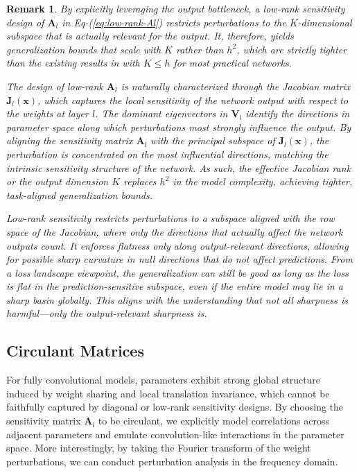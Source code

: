 \documentclass[journal]{IEEEtran} %
\def\eqref#1{Eq-(\ref{#1})}
\newtheorem{remark}{Remark}%
\def\vx{{\bm{x}}}
\def\mA{{\bm{A}}}
\def\mJ{{\bm{J}}}
\def\mV{{\bm{V}}}
\begin{document}
\begin{remark} \upshape
By explicitly leveraging the output bottleneck, a low-rank sensitivity design of $\mA_l$ in \eqref{eq:low-rank-Al} restricts perturbations to the $K$-dimensional subspace that is actually relevant for the output. It, therefore, yields generalization bounds that scale with $K$ rather than $h^2$, which are strictly tighter than the existing results in \cite{neyshabur2018pac} with $K \le h$ for most practical networks. 

The design of low-rank $\mA_l$ is naturally characterized through the Jacobian matrix $\mJ_l(\vx)$, which captures the local sensitivity of the network output with respect to the weights at layer $l$. The dominant eigenvectors in $\mV_l$ identify the directions in parameter space along which perturbations most strongly influence the output. By aligning the sensitivity matrix 
$\mA_l$ with the principal subspace of $\mJ_l(\vx)$, the perturbation is concentrated on the most influential directions, matching the intrinsic sensitivity structure of the network. As such, the effective Jacobian rank or the output dimension $K$ replaces $h^2$ in the model complexity, achieving tighter, task-aligned generalization bounds.

Low-rank sensitivity restricts perturbations to a subspace aligned with the row space of the Jacobian, where only the directions that actually affect the network outputs count. It enforces flatness only along output-relevant directions, allowing for possible sharp curvature in null directions that do not affect predictions.
From a loss landscape viewpoint, the generalization can still be good as long as the loss is flat in the prediction-sensitive subspace, even if the entire model may lie in a sharp basin globally. This aligns with the understanding that not all sharpness is harmful---only the output-relevant sharpness is.  
\end{remark}





\subsection{Circulant Matrices}
For fully convolutional models, parameters exhibit strong global structure induced by weight sharing and local translation invariance, which cannot be faithfully captured by diagonal or low-rank sensitivity designs. By choosing the sensitivity matrix $\mA_l$ to be circulant, we explicitly model correlations across adjacent parameters and emulate convolution-like interactions in the parameter space. More interestingly, by taking the Fourier transform of the weight perturbations, we can conduct perturbation analysis in the frequency domain. 
\end{document}
